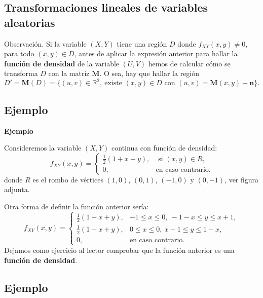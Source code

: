 \documentclass[]{book}
\begin{document}
\hypertarget{transformaciones-lineales-de-variables-aleatorias-2}{%
\subsection{Transformaciones lineales de variables aleatorias}\label{transformaciones-lineales-de-variables-aleatorias-2}}

Observación.
Si la variable \((X,Y)\) tiene una región \(D\) donde \(f_{XY}(x,y)\neq 0\), para todo \((x,y)\in D\), antes de aplicar la expresión anterior para hallar la \textbf{función de densidad} de la variable \((U,V)\) hemos de calcular cómo se transforma \(D\) con la matriz \(\mathbf{M}\). O sea, hay que hallar la región
\[
D'=\mathbf{M}(D)=\{(u,v)\in\mathbb{R}^2,\ \mbox{existe $(x,y)\in D$ con } (u,v)=\mathbf{M}(x,y)+\mathbf{n}\}.
\]

\hypertarget{ejemplo-73}{%
\subsection{Ejemplo}\label{ejemplo-73}}

\textbf{Ejemplo}

Consideremos la variable \((X,Y)\) continua con función de densidad:
\[
f_{XY}(x,y)=\begin{cases}
\frac{1}{2}(1+x+y), & \mbox{ si }(x,y)\in R, \\
0, & \mbox{en caso contrario.}
\end{cases}
\]
donde \(R\) es el rombo de vértices \((1,0)\), \((0,1)\), \((-1,0)\) y \((0,-1)\), ver figura adjunta.

Otra forma de definir la función anterior sería:
\[
f_{XY}(x,y)=\begin{cases}
\frac{1}{2}(1+x+y), & -1\leq x\leq 0,\ -1-x\leq y\leq x+1, \\
\frac{1}{2}(1+x+y), & 0\leq x\leq 0,\ x-1\leq y\leq 1-x, \\
0, & \mbox{en caso contrario.}
\end{cases}
\]
Dejamos como ejercicio al lector comprobar que la función anterior es una \textbf{función de densidad}.

\hypertarget{ejemplo-74}{%
\subsection{Ejemplo}\label{ejemplo-74}}
\end{document}
